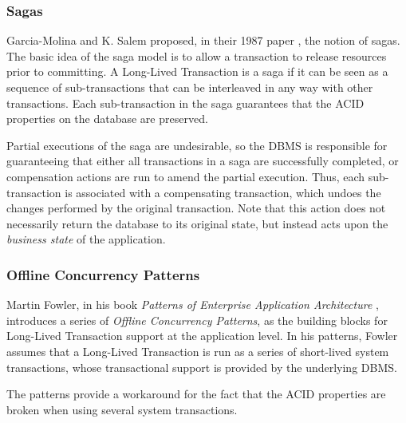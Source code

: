 \documentclass{llncs}
\begin{document}
\subsubsection{Sagas}
\label{sec:sagas}

Garcia-Molina and K. Salem proposed, in their 1987 paper
\cite{garcia1987sagas}, the notion of sagas. The basic idea of the
saga model is to allow a transaction to release resources prior to
committing. A Long-Lived Transaction is a saga if it can be seen as a
sequence of sub-transactions that can be interleaved in any way with
other transactions. Each sub-transaction in the saga guarantees that
the ACID properties on the database are preserved.

Partial executions of the saga are undesirable, so the DBMS is
responsible for guaranteeing that either all transactions in a saga
are successfully completed, or compensation actions are run to amend
the partial execution. Thus, each sub-transaction is associated with a
compensating transaction, which undoes the changes performed by the
original transaction. Note that this action does not necessarily
return the database to its original state, but instead acts upon the
{\it business state} of the application.

\subsubsection{Offline Concurrency Patterns}

Martin Fowler, in his book {\it Patterns of Enterprise Application
  Architecture} \cite{fowler2003patterns}, introduces a series of {\it
  Offline Concurrency Patterns}, as the building blocks for Long-Lived
Transaction support at the application level. In his patterns, Fowler
assumes that a Long-Lived Transaction is run as a series of
short-lived system transactions, whose transactional support is
provided by the underlying DBMS.

The patterns provide a workaround for the fact that the ACID
properties are broken when using several system transactions.
\end{document}
